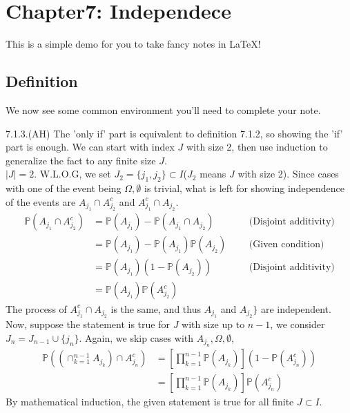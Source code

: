 \section{Chapter7: Independece}

This is a simple demo for you to take fancy notes in \LaTeX!

\subsection{Definition}
We now see some common environment you'll need to complete your note.

\begin{answer}
	7.1.3.(AH) The 'only if' part is equivalent to definition 7.1.2, so showing the 'if' part is enough. We can start with index $J$ with size 2, then use induction to generalize the fact to any finite size $J$.
	\\
	$|J|= 2$. W.L.O.G, we set $J_2 = \{j_1,j_2\} \subset I$($J_2$ means $J$ with size 2). Since cases with one of the event being $\Omega, \emptyset$ is trivial, what is left for showing independence of the events are $A_{j_1}\cap A_{j_2}^c$ and $ A_{j_1}^c \cap A_{j_2}$. 
	\begin{equation*}
		\begin{aligned}
			\mathbb{P}(A_{j_1} \cap A_{j_2}^{c}) &=  \mathbb{P}(A_{j_1}) - \mathbb{P}(A_{j_1} \cap A_{j_2})  \qquad && \text{(Disjoint additivity)}
			\\ &= \mathbb{P}(A_{j_1}) - \mathbb{P}(A_{j_1})\mathbb{P}(A_{j_2}) && \text{(Given condition)}
			\\ &= \mathbb{P}(A_{j_1})(1 - \mathbb{P}(A_{j_2})) && \text{(Disjoint additivity)}
			\\ &= \mathbb{P}(A_{j_1})\mathbb{P}(A_{j_2}^c) 
		\end{aligned}
	\end{equation*}
	The process of $A_{j_1}^c \cap A_{j_2}$ is the same, and thus $A_{j_1}$ and $A_{j_2}\}$ are independent.  
	Now, suppose the statement is true for $J$ with size up to $n-1$, we consider $J_n = J_{n-1} \cup \{j_n\}$. Again, we skip cases with $A_{j_n},\Omega, \emptyset$,
	\begin{equation*}
		\begin{aligned}
			\mathbb{P}((\cap_{k=1}^{n-1} A_{j_k}) \cap A_{j_n}^c)  &= [\prod_{k=1}^{n-1}\mathbb{P}(A_{j_k})](1 - \mathbb{P}(A_{j_n}^c))
			\\ &=  [\prod_{k=1}^{n-1}\mathbb{P}(A_{j_k})] \mathbb{P}(A_{j_n}^c) 
		\end{aligned}
	\end{equation*}
	By mathematical induction, the given statement is true for all finite $J \subset I$. 
\end{answer}


